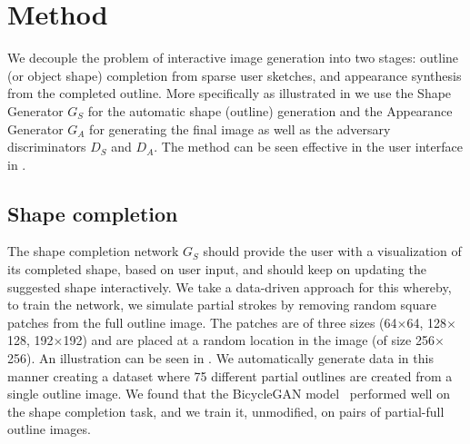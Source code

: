 \section{Method}
We decouple the problem of interactive image generation into two stages: outline (or object shape) completion from sparse user sketches, and appearance synthesis from the completed outline. More specifically as illustrated in  we use the Shape Generator $G_S$ for the automatic shape (outline) generation and the Appearance Generator $G_A$ for generating the final image as well as the adversary discriminators $D_S$ and $D_A$. The method can be seen effective in the user interface in .

\subsection{Shape completion}
\label{sec:shape}
The shape completion network $G_S$ should provide the user with a visualization of its  completed shape, based on user input, and should keep on updating the suggested shape interactively. 
We take a data-driven approach for this whereby, to train the network, we simulate partial strokes by removing random square patches from the full outline image. 
The patches are of three sizes (64$\times$64, 128$\times$128, 192$\times$192) and are placed at a random location in the image (of size 256$\times$256). An illustration can be seen in .
We automatically generate data in this manner creating a dataset where 75 different partial outlines are created from a single outline image.
We found that the BicycleGAN model~\cite{zhu2017toward} performed well on the shape completion task, and we train it, unmodified, on pairs of partial-full outline images. %

